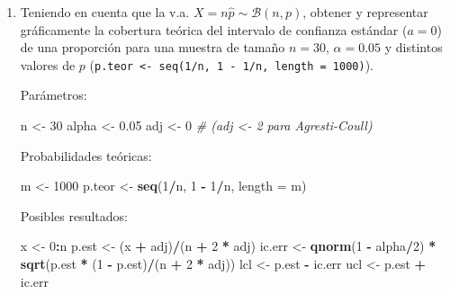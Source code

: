 \documentclass[
]{book}
\newenvironment{Shaded}{\begin{snugshade}}{\end{snugshade}}
\newcommand{\CommentTok}[1]{\textcolor[rgb]{0.56,0.35,0.01}{\textit{#1}}}
\newcommand{\DataTypeTok}[1]{\textcolor[rgb]{0.13,0.29,0.53}{#1}}
\newcommand{\DecValTok}[1]{\textcolor[rgb]{0.00,0.00,0.81}{#1}}
\newcommand{\FloatTok}[1]{\textcolor[rgb]{0.00,0.00,0.81}{#1}}
\newcommand{\KeywordTok}[1]{\textcolor[rgb]{0.13,0.29,0.53}{\textbf{#1}}}
\newcommand{\NormalTok}[1]{#1}
\newcommand{\OperatorTok}[1]{\textcolor[rgb]{0.81,0.36,0.00}{\textbf{#1}}}
\newcommand{\StringTok}[1]{\textcolor[rgb]{0.31,0.60,0.02}{#1}}
\theoremstyle{break}
\theoremstyle{definition}
\theoremstyle{definition}
\theoremstyle{definition}
\theoremstyle{remark}
\begin{document}
\begin{enumerate}
\def\labelenumi{\alph{enumi})}
\item
  Teniendo en cuenta que la v.a. \(X=n\hat{p}\sim\mathcal{B}(n,p)\),
  obtener y representar gráficamente la cobertura teórica del
  intervalo de confianza estándar (\(a=0\)) de una proporción para
  una muestra de tamaño \(n=30\), \(\alpha=0.05\) y distintos valores
  de \(p\) (\texttt{p.teor\ \textless{}-\ seq(1/n,\ 1\ -\ 1/n,\ length\ =\ 1000)}).

  Parámetros:

\begin{Shaded}
\begin{Highlighting}[]
\NormalTok{n <-}\StringTok{ }\DecValTok{30}
\NormalTok{alpha <-}\StringTok{ }\FloatTok{0.05}
\NormalTok{adj <-}\StringTok{ }\DecValTok{0}  \CommentTok{# (adj <- 2 para Agresti-Coull)}
\end{Highlighting}
\end{Shaded}

  Probabilidades teóricas:

\begin{Shaded}
\begin{Highlighting}[]
\NormalTok{m <-}\StringTok{ }\DecValTok{1000}
\NormalTok{p.teor <-}\StringTok{ }\KeywordTok{seq}\NormalTok{(}\DecValTok{1}\OperatorTok{/}\NormalTok{n, }\DecValTok{1} \OperatorTok{-}\StringTok{ }\DecValTok{1}\OperatorTok{/}\NormalTok{n, }\DataTypeTok{length =}\NormalTok{ m) }
\end{Highlighting}
\end{Shaded}

  Posibles resultados:

\begin{Shaded}
\begin{Highlighting}[]
\NormalTok{x <-}\StringTok{ }\DecValTok{0}\OperatorTok{:}\NormalTok{n}
\NormalTok{p.est <-}\StringTok{ }\NormalTok{(x }\OperatorTok{+}\StringTok{ }\NormalTok{adj)}\OperatorTok{/}\NormalTok{(n }\OperatorTok{+}\StringTok{ }\DecValTok{2} \OperatorTok{*}\StringTok{ }\NormalTok{adj) }
\NormalTok{ic.err <-}\StringTok{ }\KeywordTok{qnorm}\NormalTok{(}\DecValTok{1} \OperatorTok{-}\StringTok{ }\NormalTok{alpha}\OperatorTok{/}\DecValTok{2}\NormalTok{) }\OperatorTok{*}\StringTok{ }\KeywordTok{sqrt}\NormalTok{(p.est }\OperatorTok{*}\StringTok{ }\NormalTok{(}\DecValTok{1} \OperatorTok{-}\StringTok{ }\NormalTok{p.est)}\OperatorTok{/}\NormalTok{(n }\OperatorTok{+}\StringTok{ }\DecValTok{2} \OperatorTok{*}\StringTok{ }\NormalTok{adj))  }
\NormalTok{lcl <-}\StringTok{ }\NormalTok{p.est }\OperatorTok{-}\StringTok{ }\NormalTok{ic.err }
\NormalTok{ucl <-}\StringTok{ }\NormalTok{p.est }\OperatorTok{+}\StringTok{ }\NormalTok{ic.err }
\end{Highlighting}
\end{Shaded}


\end{enumerate}
\end{document}
